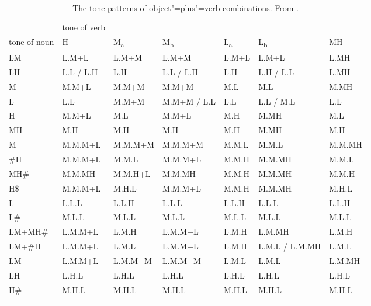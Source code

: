 \begin{refsection}


\begin{sidewaystable}[p]
	\caption{\label{tab:thetonepatternsofobjectREF}The tone patterns of object"=plus"=verb combinations. From .}
	{\renewcommand{\arraystretch}{1.1}
		\begin{tabularx}{\textheight}{ l@{\hspace{6mm}} Q l@{\hspace{6mm}} l@{\hspace{6mm}} l@{\hspace{6mm}} l@{\hspace{6mm}} Q }
			\lsptoprule
			& tone of verb\\
			tone of noun & H & M\textsubscript{a} & M\textsubscript{b} & L\textsubscript{a} & L\textsubscript{b} & MH\\ \midrule
			LM & L.M+L & L.M+M & L.M+M & L.M+L & L.M+L & L.MH\\
			LH & L.L / L.H & L.H & L.L / L.H & L.H & L.H / L.L & L.MH\\
			M & M.M+L & M.M+M & M.M+M & M.L & M.L & M.MH\\
			L & L.L & M.M+M & M.M+M / L.L & L.L & L.L / M.L & L.L\\
			H & M.M+L & M.L & M.M+L & M.H & M.MH & M.L\\
			MH & M.H & M.H & M.H & M.H & M.MH & M.H\\  \addlinespace \hdashline \addlinespace
			M & M.M.M+L & M.M.M+M & M.M.M+M & M.M.L & M.M.L & M.M.MH\\
			\#H & M.M.M+L & M.M.L & M.M.M+L & M.M.H & M.M.MH & M.M.L\\
			MH\# & M.M.MH & M.M.H+L & M.M.MH & M.M.H & M.M.MH & M.M.H\\
			H\$ & M.M.M+L & M.H.L & M.M.M+L & M.M.H & M.M.MH & M.H.L\\
			L & L.L.L & L.L.H & L.L.L & L.L.H & L.L.L & L.L.H\\
			L\# & M.L.L & M.L.L & M.L.L & M.L.L & M.L.L & M.L.L\\
			LM+MH\# & L.M.M+L & L.M.H & L.M.M+L & L.M.H & L.M.MH & L.M.H\\
			LM+\#H & L.M.M+L & L.M.L & L.M.M+L & L.M.H & L.M.L / L.M.MH & L.M.L\\
			LM & L.M.M+L & L.M.M+M & L.M.M+M & L.M.L & L.M.L & L.M.MH\\
			LH & L.H.L & L.H.L & L.H.L & L.H.L & L.H.L & L.H.L\\
			H\# & M.H.L & M.H.L & M.H.L & M.H.L & M.H.L & M.H.L\\
			\lspbottomrule
		\end{tabularx}}
	\end{sidewaystable}

\end{refsection}